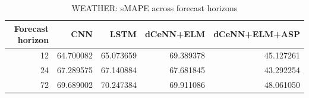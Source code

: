 \begin{table}
\caption{WEATHER: sMAPE across forecast horizons}
\begin{tabular}{rrrrr}
\toprule
Forecast horizon & CNN & LSTM & dCeNN+ELM & dCeNN+ELM+ASP \\
\midrule
12 & 64.700082 & 65.073659 & 69.389378 & 45.127261 \\
24 & 67.289575 & 67.140884 & 67.681845 & 43.292254 \\
72 & 69.689002 & 70.247384 & 69.911086 & 48.061050 \\
\bottomrule
\end{tabular}
\end{table}
